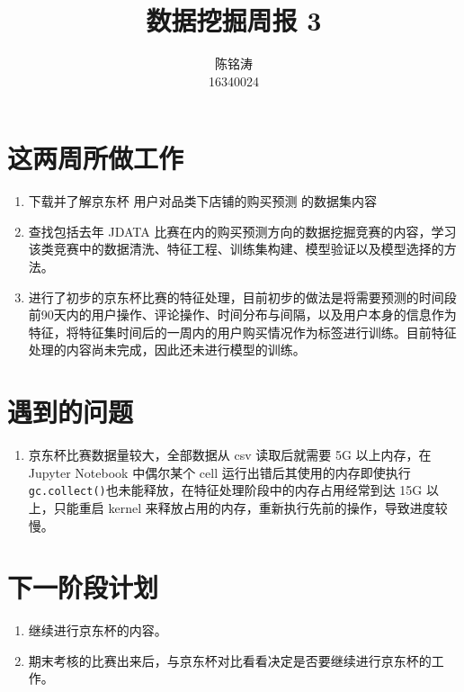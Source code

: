 \documentclass[12pt]{article}
\begin{document}
\author{陈铭涛\\16340024}
\title{数据挖掘周报 3}
\maketitle

\medskip


\section{这两周所做工作}
\begin{enumerate}
    \item 下载并了解京东杯 用户对品类下店铺的购买预测 的数据集内容
    \item 查找包括去年 JDATA 比赛在内的购买预测方向的数据挖掘竞赛的内容，学习该类竞赛中的数据清洗、特征工程、训练集构建、模型验证以及模型选择的方法。
    \item 进行了初步的京东杯比赛的特征处理，目前初步的做法是将需要预测的时间段前90天内的用户操作、评论操作、时间分布与间隔，以及用户本身的信息作为特征，将特征集时间后的一周内的用户购买情况作为标签进行训练。目前特征处理的内容尚未完成，因此还未进行模型的训练。
\end{enumerate}

\section{遇到的问题}
\begin{enumerate}
    \item 京东杯比赛数据量较大，全部数据从 csv 读取后就需要 5G 以上内存，在 Jupyter Notebook 中偶尔某个 cell 运行出错后其使用的内存即使执行\lstinline{gc.collect()}也未能释放，在特征处理阶段中的内存占用经常到达 15G 以上，只能重启 kernel 来释放占用的内存，重新执行先前的操作，导致进度较慢。
\end{enumerate}


\section{下一阶段计划}

\begin{enumerate}
    \item 继续进行京东杯的内容。
    \item 期末考核的比赛出来后，与京东杯对比看看决定是否要继续进行京东杯的工作。
\end{enumerate}
\end{document}

